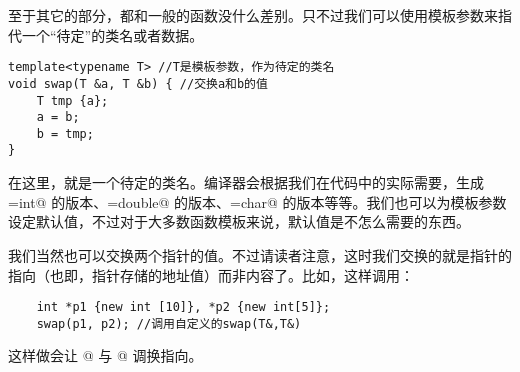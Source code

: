 至于其它的部分，都和一般的函数没什么差别。只不过我们可以使用模板参数来指代一个``待定''的类名或者数据。
\begin{lstlisting}
template<typename T> //T是模板参数，作为待定的类名
void swap(T &a, T &b) { //交换a和b的值
    T tmp {a};
    a = b;
    b = tmp;
}
\end{lstlisting}
在这里，\lstinline@T@ 就是一个待定的类名。编译器会根据我们在代码中的实际需要，生成\lstinline@T=int@ 的版本、\lstinline@T=double@ 的版本、\lstinline@T=char@ 的版本等等。我们也可以为模板参数设定默认值，不过对于大多数函数模板来说，默认值是不怎么需要的东西。\par
我们当然也可以交换两个指针的值。不过请读者注意，这时我们交换的就是指针的指向（也即，指针存储的地址值）而非内容了。比如，这样调用：
\begin{lstlisting}
    int *p1 {new int [10]}, *p2 {new int[5]};
    swap(p1, p2); //调用自定义的swap(T&,T&)
\end{lstlisting}
这样做会让 @ 与 @ 调换指向。\par
